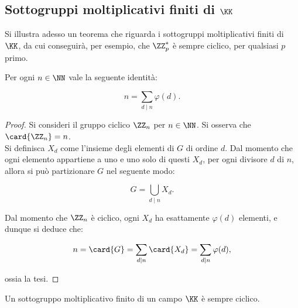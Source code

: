 \subsection{Sottogruppi moltiplicativi finiti di \texorpdfstring{$\KK$}{K}}

Si illustra adesso un teorema che riguarda i sottogruppi
moltiplicativi finiti di $\KK$, da cui conseguirà,
per esempio, che $\ZZ_p^*$ è sempre ciclico, per
qualsiasi $p$ primo. \\

\begin{lemma}
    \label{lem:somma_phi_n}
    Per ogni $n \in \NN$ vale la seguente identità:

    \[ n = \sum_{d \mid n} \varphi(d). \]
\end{lemma}

\begin{proof}
    Si consideri il gruppo ciclico $\ZZ_n$ per $n \in \NN$.
    Si osserva che $\card{\ZZ_n} = n$. \\

    Si definisca $X_d$ come l'insieme degli elementi di $G$
    di ordine $d$. Dal momento che ogni elemento appartiene
    a uno e uno solo di questi $X_d$, per ogni divisore
    $d$ di $n$, allora si può partizionare $G$ nel
    seguente modo:

    \begin{equation*}
        G = \bigcup_{d \mid n} X_d.
    \end{equation*}

    Dal momento che $\ZZ_n$ è ciclico, ogni $X_d$ ha esattamente
    $\varphi(d)$ elementi, e dunque si deduce che:

    \begin{equation*}
        n = \card{G} = \sum_{d \mid n} \card{X_d} =  \sum_{d \mid n} \varphi(d),
    \end{equation*}

    ossia la tesi.
\end{proof}

\begin{theorem}
    Un sottogruppo moltiplicativo finito di un campo
    $\KK$ è sempre ciclico.
\end{theorem}

